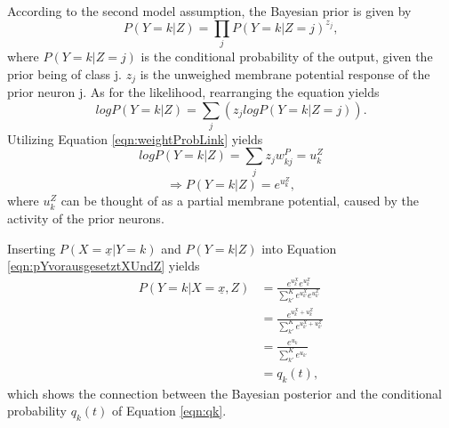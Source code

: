 According to the second model assumption, the Bayesian prior is given by
\begin{equation}
\label{eqn:P2}
P(Y=k|Z) = \prod_j P(Y=k|Z=j)^{z_j},
\end{equation}
where $P(Y=k|Z=j)$ is the conditional probability of the output, given the prior being of class j. $z_j$ is the unweighed membrane potential response of the prior neuron j. As for the likelihood, rearranging the equation yields
\begin{equation}
log P(Y=k|Z) = \sum_j (z_j log P(Y=k|Z=j)).
\end{equation}
Utilizing Equation \ref{eqn:weightProbLink} yields
\begin{equation}
log P(Y=k|Z) = \sum_j z_j w^P_{kj} = u^Z_k
\end{equation}
\begin{equation}
\Rightarrow P(Y=k|Z) = e^{u^Z_k},
\end{equation}
where $u^Z_k$ can be thought of as a partial membrane potential, caused by the activity of the prior neurons.

Inserting $P(X=\underline{x}|Y=k)$ and $P(Y=k|Z)$ into Equation \ref{eqn:pYvorausgesetztXUndZ} yields
\begin{equation}
\begin{split}
P(Y=k|X=\underline{x},Z) &= \frac{e^{u^X_k} e^{u^Z_k}}{\sum^K_{k'} e^{u^X_{k'}} e^{u^Z_{k'}}}\\
&= \frac{e^{u^X_k + u^Z_k}}{\sum^K_{k'} e^{u^X_{k'} + u^Z_{k'}}}\\
&= \frac{e^{u_k}}{\sum^K_{k'} e^{u_{k'}}}\\
&= q_k(t),
\end{split}
\end{equation}
which shows the connection between the Bayesian posterior and the conditional probability $q_k(t)$ of Equation \ref{eqn:qk}.
